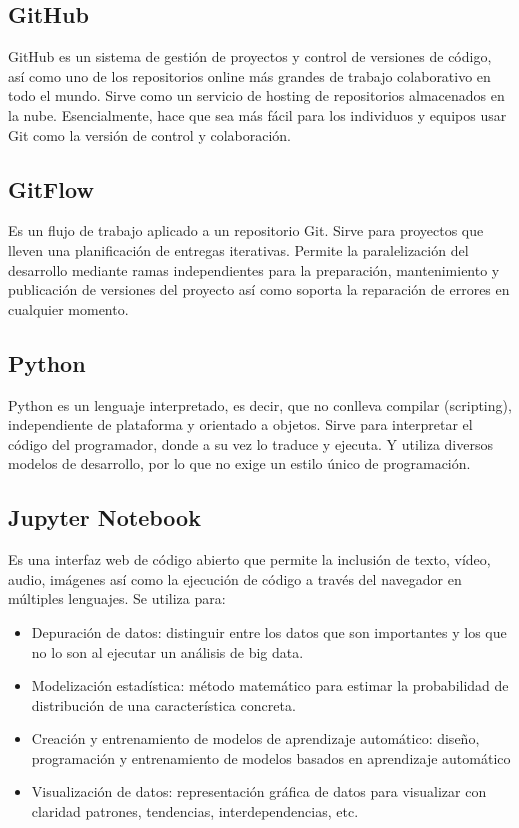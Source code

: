 \documentclass[12pt,letterpaper]{article}
\begin{document}
\subsection*{GitHub}
GitHub es un sistema de gesti\'on de proyectos y control de versiones de c\'odigo, as\'i como uno de los repositorios online m\'as grandes de trabajo colaborativo en todo el mundo.
Sirve como un servicio de hosting de repositorios almacenados en la nube. Esencialmente, hace que sea m\'as f\'acil para los individuos y equipos usar Git como la versi\'on de control y colaboraci\'on.

\subsection*{GitFlow}
Es un flujo de trabajo aplicado a un repositorio Git. 
Sirve para proyectos que lleven una planificaci\'on de entregas iterativas. Permite la paralelización del desarrollo mediante ramas independientes para la preparaci\'on, mantenimiento y publicaci\'on de versiones del proyecto as\'i como soporta la reparaci\'on de errores en cualquier momento.

\subsection*{Python}
Python es un lenguaje interpretado, es decir, que no conlleva compilar (scripting), independiente de plataforma y orientado a objetos. 
Sirve para interpretar el c\'odigo del programador, donde a su vez lo traduce y ejecuta. Y utiliza diversos modelos de desarrollo, por lo que no exige un estilo \'unico de programaci\'on.


\subsection*{Jupyter Notebook}
Es una interfaz web de c\'odigo abierto que permite la inclusi\'on de texto, v\'ideo, audio, im\'agenes as\'i como la ejecuci\'on de c\'odigo a trav\'es del navegador en m\'ultiples lenguajes. 
Se utiliza para: 
\begin{itemize}
\item Depuraci\'on de datos: distinguir entre los datos que son importantes y los que no lo son al ejecutar un an\'alisis de big data.
\item Modelizaci\'on estad\'istica: m\'etodo matem\'atico para estimar la probabilidad de distribuci\'on de una caracter\'istica concreta.
\item Creaci\'on y entrenamiento de modelos de aprendizaje autom\'atico: diseño, programaci\'on y entrenamiento de modelos basados en aprendizaje autom\'atico
\item Visualizaci\'on de datos: representaci\'on gr\'afica de datos para visualizar con claridad patrones, tendencias, interdependencias, etc.
\end{itemize}
\end{document}
